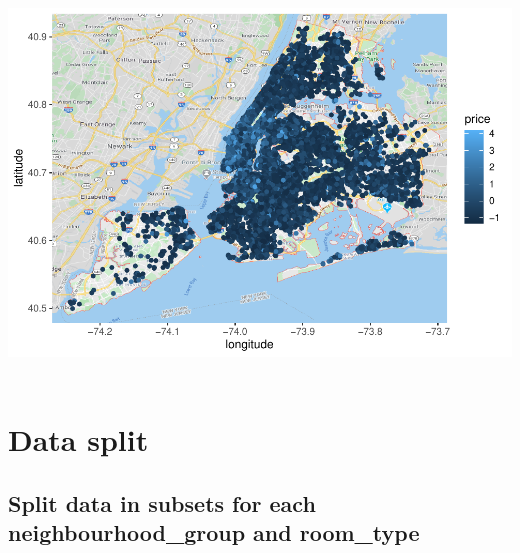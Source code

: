 \documentclass[
]{article}
\begin{document}
\includegraphics{project-code_files/figure-latex/unnamed-chunk-9-1.pdf}
~\\

\hypertarget{data-split}{%
\section{Data split}\label{data-split}}

\hypertarget{split-data-in-subsets-for-each-neighbourhood_group-and-room_type}{%
\subsection{Split data in subsets for each neighbourhood\_group and
room\_type}\label{split-data-in-subsets-for-each-neighbourhood_group-and-room_type}}
\end{document}
